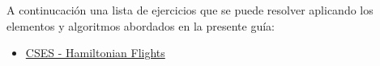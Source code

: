 A continucación una lista de ejercicios que se puede resolver aplicando los elementos y algoritmos abordados en la presente guía:

\begin{itemize}
	\item \href{https://cses.fi/problemset/task/1690}{CSES - Hamiltonian Flights}
\end{itemize}